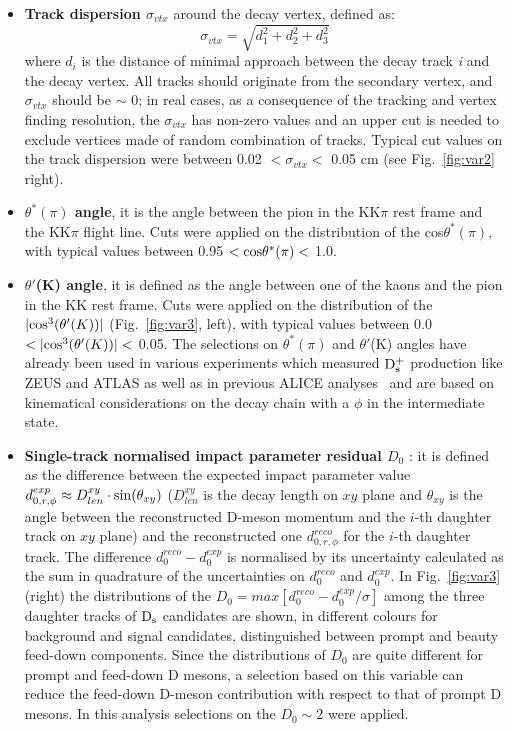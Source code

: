 \begin{itemize}
\item \textbf{Track dispersion $\sigma_{vtx}$} around the decay vertex, defined as:
\[
\sigma_{vtx}=\sqrt{d^2_1+d^2_2+d^2_3}
\]
where $d_i$ is the distance of minimal approach between the decay 
track \textit{i} and the decay vertex. All tracks should originate from 
the secondary vertex, and $\sigma_{vtx}$ should be $\sim$ 0; in 
real cases, as a consequence of the tracking and vertex finding resolution, 
the $\sigma_{vtx}$ has non-zero values and an upper cut is needed 
to exclude vertices made of random combination of tracks. Typical cut
 values on the track dispersion were between 0.02 $< \sigma_{vtx}<$ 0.05 cm 
 (see Fig.~\ref{fig:var2} right).
\item \textbf{$\theta^*(\pi)$ angle}, it is the angle between the pion 
in the KK$\pi$ rest frame and the KK$\pi$ flight line. Cuts were applied
 on the distribution of the cos$\theta^*(\pi)$, with typical values 
 between 0.95 $<{\rm cos}\theta^*(\pi)  <$ 1.0.
\item \textbf{$\theta'$(K) angle}, it is defined as the angle between
 one of the kaons and the pion in the KK rest frame. Cuts were 
 applied on the distribution of the $|{\rm cos}^3(\theta'(K))|$ (Fig.~\ref{fig:var3}, left), with typical 
 values between 0.0 $<|{\rm cos}^3(\theta'(K))| <$ 0.05.
 The selections on $\theta^*(\pi)$ and $\theta'$(K) angles have already 
been used in various experiments which measured ${\rm D_s^+}$ production 
like ZEUS \cite{Chekanov:2005mm} and ATLAS \cite{ATLAS:2011fea} as well as 
in previous ALICE analyses~\cite{ALICE:2011aa,Abelev:2012tca,Adam:2016ich,Adam:2015jda}
 and are based on kinematical 
considerations on the decay chain with a $\phi$ in the intermediate state.
\item \textbf{Single-track normalised impact parameter residual $D_{0}$} : it is defined 
as the difference between the expected 
impact parameter value $d^{exp}_{0,r,\phi} \approx D_{len}^{xy} \cdot {\rm sin}(\theta_{xy})$
 ($D_{len}^{xy}$ is the decay length on $xy$ plane and $\theta_{xy}$ is the angle 
between the reconstructed D-meson momentum and the $i$-th daughter track on $xy$ plane) 
and the reconstructed one $d^{reco}_{0,r,\phi}$ for the $i$-th daughter
track. The difference $d^{reco}_{0}-d^{exp}_{0}$ is normalised by its uncertainty
calculated as the sum in quadrature of the uncertainties on $d^{reco}_{0}$ and $d^{exp}_{0}$.
In Fig.~\ref{fig:var3} (right) the distributions of the $D_{0} = max[d^{reco}_{0}-d^{exp}_{0}/\sigma]$ among 
the three daughter tracks of ${\rm D_s}$ candidates are shown, in different colours for
background and signal candidates, distinguished between prompt and beauty 
feed-down components. Since the distributions of $D_{0}$ 
are quite different for prompt and feed-down D mesons, 
a selection based on this variable can reduce the feed-down D-meson contribution with respect to 
that of prompt D mesons. In this analysis selections on the $D_{0} \sim 2$
were applied.
\end{itemize}

